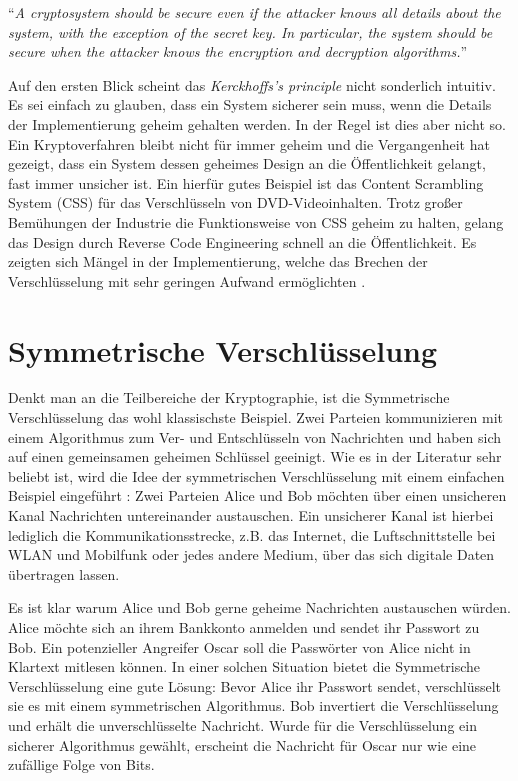 \begin{definition}
  \enquote{\textit{A cryptosystem should be secure even if the attacker knows all details about
      the system, with the exception of the secret key. In particular, the system should be secure when
      the attacker knows the encryption and decryption algorithms.}}
\end{definition}

\noindent
Auf den ersten Blick scheint das \textit{Kerckhoffs's principle} nicht sonderlich intuitiv.
Es sei einfach zu glauben, dass ein System
sicherer sein muss, wenn die Details der Implementierung geheim gehalten werden.
In der Regel ist dies aber nicht so. Ein Kryptoverfahren bleibt nicht für immer geheim und die
Vergangenheit hat gezeigt, dass ein System dessen geheimes Design an die Öffentlichkeit
gelangt, fast immer unsicher ist. Ein hierfür gutes Beispiel ist das Content Scrambling System (CSS)
für das Verschlüsseln von DVD-Videoinhalten. Trotz großer Bemühungen der Industrie die
Funktionsweise von CSS geheim zu halten, gelang das Design durch Reverse Code Engineering
schnell an die Öffentlichkeit. Es zeigten sich Mängel in der Implementierung,
welche das Brechen der Verschlüsselung mit sehr geringen Aufwand ermöglichten \parencite{SITE:CSS}.

\section{Symmetrische Verschlüsselung}
Denkt man an die Teilbereiche der Kryptographie, ist die Symmetrische Verschlüsselung
das wohl klassischste Beispiel. Zwei Parteien kommunizieren mit einem
Algorithmus zum Ver- und Entschlüsseln von Nachrichten und haben sich auf einen
gemeinsamen geheimen Schlüssel geeinigt. Wie es in der Literatur sehr beliebt ist,
wird die Idee der symmetrischen Verschlüsselung
mit einem einfachen Beispiel eingeführt \parencite[4-6]{BOOK:crypto}:
Zwei Parteien Alice und Bob möchten über einen unsicheren Kanal Nachrichten untereinander austauschen.
Ein unsicherer Kanal ist hierbei lediglich die Kommunikationsstrecke,
z.B. das Internet, die Luftschnittstelle bei WLAN und Mobilfunk
oder jedes andere Medium, über das sich digitale Daten übertragen lassen.



\noindent
Es ist klar warum Alice und Bob gerne geheime Nachrichten austauschen würden. Alice möchte sich an ihrem
Bankkonto anmelden und sendet ihr Passwort zu Bob. Ein potenzieller Angreifer Oscar
soll die Passwörter von Alice nicht in Klartext mitlesen können.
In einer solchen Situation bietet die Symmetrische Verschlüsselung eine gute Lösung:
Bevor Alice ihr Passwort sendet, verschlüsselt sie es mit einem symmetrischen Algorithmus.
Bob invertiert die Verschlüsselung und erhält die unverschlüsselte Nachricht. Wurde für
die Verschlüsselung ein sicherer Algorithmus gewählt, erscheint die Nachricht für Oscar nur wie
eine zufällige Folge von Bits.
\newpage

